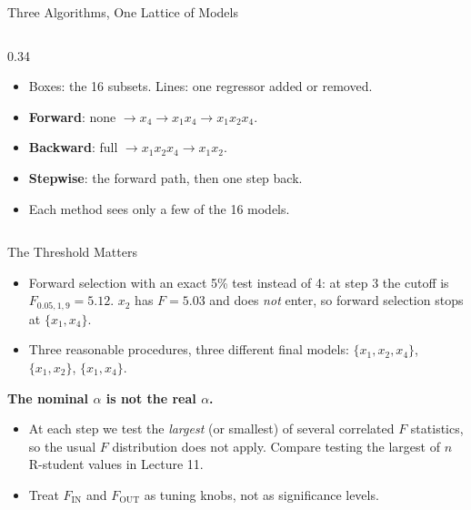 \begin{frame}{Three Algorithms, One Lattice of Models}
\begin{columns}[T]
\begin{column}{0.34\textwidth}
            \footnotesize
            \begin{itemize}
                \item Boxes: the 16 subsets. Lines: one regressor added or removed.
                \item \textcolor{teal!70!black}{\textbf{Forward}}: none $\to x_4\to x_1x_4\to x_1x_2x_4$.
                \item \textcolor{orange!85!black}{\textbf{Backward}}: full $\to x_1x_2x_4\to x_1x_2$.
                \item \textbf{Stepwise}: the forward path, then one step back.
                \item Each method sees only a few of the 16 models.
            \end{itemize}
        \end{column}
    \end{columns}
\end{frame}


\begin{frame}{The Threshold Matters}
    \begin{itemize}
        \item Forward selection with an exact 5\% test instead of 4: at step 3 the cutoff is $F_{0.05,1,9}=5.12$. $x_2$ has $F=5.03$ and does \emph{not} enter, so forward selection stops at $\{x_1,x_4\}$.
        \item Three reasonable procedures, three different final models: $\{x_1,x_2,x_4\}$, $\{x_1,x_2\}$, $\{x_1,x_4\}$.
    \end{itemize}
    \svspace{0.5em}
    \textbf{The nominal $\alpha$ is not the real $\alpha$.}
    \begin{itemize}
        \item At each step we test the \emph{largest} (or smallest) of several correlated $F$ statistics, so the usual $F$ distribution does not apply. Compare testing the largest of $n$ R-student values in Lecture 11.
        \item Treat $F_{\text{IN}}$ and $F_{\text{OUT}}$ as tuning knobs, not as significance levels.
    \end{itemize}
\end{frame}


